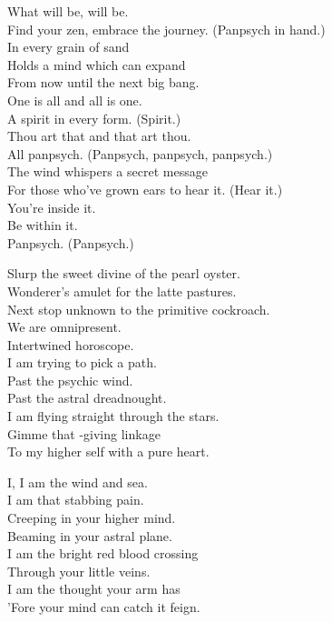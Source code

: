 What will be, will be. \\
Find your zen, embrace the journey. (Panpsych in hand.) \\
In every grain of sand \\
Holds a mind which can expand \\
From now until the next big bang. \\

One is all and all is one. \\
A spirit in every form. (Spirit.) \\
Thou art that and that art thou. \\
All panpsych. (Panpsych, panpsych, panpsych.) \\
The wind whispers a secret message \\
For those who've grown ears to hear it. (Hear it.) \\

You're inside it. \\
Be within it. \\
Panpsych. (Panpsych.) \\


Slurp the sweet divine of the pearl oyster. \\
Wonderer's amulet for the latte pastures. \\
Next stop unknown to the primitive cockroach. \\
We are omnipresent. \\
Intertwined horoscope. \\

I am trying to pick a path. \\
Past the psychic wind. \\
Past the astral dreadnought. \\
I am flying straight through the stars. \\
Gimme that -giving linkage \\
To my higher self with a pure heart. \\


I, I am the wind and sea. \\
I am that stabbing pain. \\
Creeping in your higher mind. \\
Beaming in your astral plane. \\
I am the bright red blood crossing \\
Through your little veins. \\
I am the thought your arm has \\
'Fore your mind can catch it feign. \\

